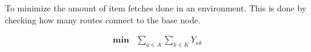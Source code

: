 To minimize the amount of item fetches done in an environment. This is done by checking how many routes connect to the base node.

\begin{align*}
    \mathbf{min} & \sum_{a \in A} \sum_{k \in K} {Y_{ak}}
\end{align*}